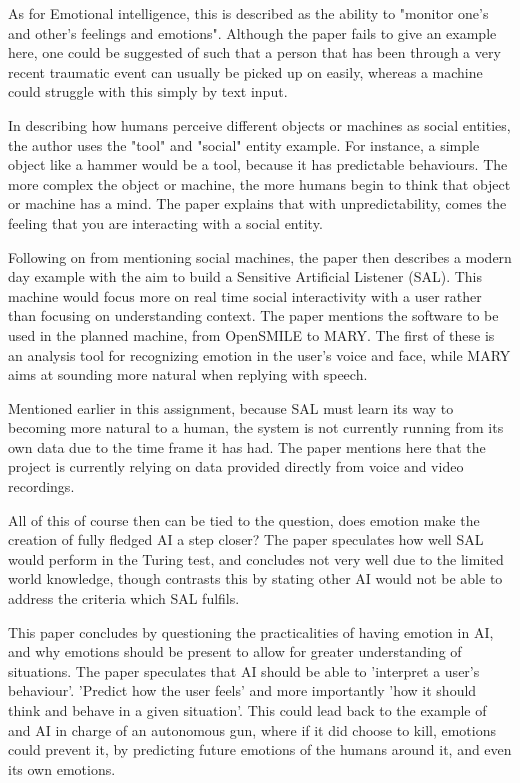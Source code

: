\documentclass[article]{IEEEtran}
\begin{document}
As for Emotional intelligence, this is described as the ability to "monitor one's and other's feelings and emotions". Although the paper fails to give an example here, one could be suggested of such that a person that has been through a very recent traumatic event can usually be picked up on easily, whereas a machine could struggle with this simply by text input. \par
In describing how humans perceive different objects or machines as social entities, the author uses the "tool" and "social" entity example. For instance, a simple object like a hammer would be a tool, because it has predictable behaviours. The more complex the object or machine, the more humans begin to think that object or machine has a mind. The paper explains that with unpredictability, comes the feeling that you are interacting with a social entity.\par
Following on from mentioning social machines, the paper then describes a modern day example with the aim to build a Sensitive Artificial Listener (SAL). This machine would focus more on real time social interactivity with a user rather than focusing on understanding context. The paper mentions the software to be used in the planned machine, from OpenSMILE to MARY. The first of these is an analysis tool for recognizing emotion in the user's voice and face, while MARY aims at sounding more natural when replying with speech. \par
Mentioned earlier in this assignment, because SAL must learn its way to becoming more natural to a human, the system is not currently running from its own data due to the time frame it has had. The paper mentions here that the project is currently relying on data provided directly from voice and video recordings. \par
All of this of course then can be tied to the question, does emotion make the creation of fully fledged AI a step closer? The paper speculates how well SAL would perform in the Turing test, and concludes not very well due to the limited world knowledge, though contrasts this by stating other AI would not be able to address the criteria which SAL fulfils.\par
This paper concludes by questioning the practicalities of having emotion in AI, and why emotions should be present to allow for greater understanding of situations. The paper speculates that AI should be able to 'interpret a user's behaviour'. 'Predict how the user feels' and more importantly 'how it should think and behave in a given situation'. This could lead back to the example of and AI in charge of an autonomous gun, where if it did choose to kill, emotions could prevent it, by predicting future emotions of the humans around it, and even its own emotions. \par
\end{document}

